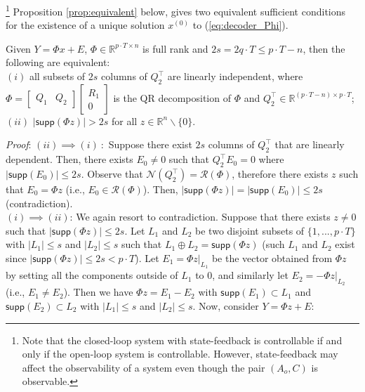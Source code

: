 \documentclass[../../thesis.tex]{subfiles}
\begin{document}
\footnote{Note that the closed-loop system with state-feedback is controllable if and only if the open-loop system is controllable. However, state-feedback may affect the observability of a system even though the pair $(A_o,C)$ is observable.}
Proposition \ref{prop:equivalent} below, gives two equivalent sufficient conditions for the existence of a unique solution $x^{(0)}$ to (\ref{eq:decoder_Phi}).

\begin{proposition} \label{prop:equivalent}
	Given $Y=\Phi x + E$, $\Phi \in \mathbb{R}^{p\cdot T \times n}$ is full rank and $2s = 2q\cdot T \leq  p\cdot T-n$, then the following are equivalent: \\
$(i)$ all subsets of $2s$ columns of $Q_2 ^\top$ are linearly independent, where  $\Phi = \begin{bmatrix} Q_1 & Q_2 \end{bmatrix} \begin{bmatrix} R_1 \\ 0 \end{bmatrix}$ is the QR decomposition of $\Phi$ and $Q_2 ^\top \in \mathbb{R}^{(p\cdot T-n)\times p\cdot T}$;\\
$(ii)$ $\lvert \textsf{supp}( \Phi z) \rvert > 2 s$ for all $z \in \mathbb{R}^n \backslash \{ 0 \}$.
\end{proposition}

\textit{Proof}:
$(ii) \implies (i)~:$ Suppose there exist $2s$ columns of $Q_2^\top$ that are linearly dependent. Then, there exists $E_0 \neq 0$ such that $Q_2^\top E_0 = 0$ where $\lvert \textsf{supp}(E_0) \rvert \le 2s$. Observe that $\mathcal{N}(Q_2^\top) = \mathcal{R}(\Phi)$, therefore there exists $z$ such that $E_0 = \Phi z$ (i.e., $E_0 \in \mathcal{R}(\Phi)$). Then, $ \lvert  \textsf{supp}(\Phi z) \rvert = \lvert \textsf {supp} (E_0) \rvert \le 2s $ (contradiction).\\
$(i) \implies (ii)$: We again resort to contradiction. Suppose that there exists $z\neq 0$ such that $\lvert \textsf{supp}(\Phi z)\rvert \le 2s$. Let $L_1$ and $L_2$ be two disjoint subsets of $\{1,..., p\cdot T \}$ with $\lvert L_1 \rvert \le s$ and $\lvert L_2 \rvert \le s$ such that $L_1 \oplus L_2 = \textsf{supp}(\Phi z)$ (such $L_1$ and $L_2$ exist since $\lvert \textsf{supp}(\Phi z) \rvert \le 2s < p\cdot T$). Let $E_1 = \Phi z \lvert _{L_1}$ be the vector obtained from $\Phi z$ by setting all the components outside of $L_1$ to 0, and similarly let $E_2= - \Phi z \lvert _{L_2}$ (i.e., $E_1 \neq E_2$). Then we have $\Phi z = E_1 - E_2$ with $\textsf{supp}(E_1) \subset L_1$ and $\textsf{supp}(E_2) \subset L_2$ with $\lvert L_1 \rvert \le s$ and $\lvert L_2 \rvert \le s$. Now, consider $Y=\Phi z + E$:
\end{document}
